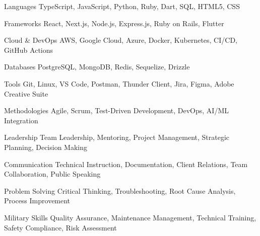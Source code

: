

\begin{cvskills}

  \cvskill
    {Languages} %
    {TypeScript, JavaScript, Python, Ruby, Dart, SQL, HTML5, CSS} %

  \cvskill
    {Frameworks} %
    {React, Next.js, Node.js, Express.js, Ruby on Rails, Flutter} %

  \cvskill
    {Cloud \& DevOps} %
    {AWS, Google Cloud, Azure, Docker, Kubernetes, CI/CD, GitHub Actions} %

  \cvskill
    {Databases} %
    {PostgreSQL, MongoDB, Redis, Sequelize, Drizzle} %

  \cvskill
    {Tools} %
    {Git, Linux, VS Code, Postman, Thunder Client, Jira, Figma, Adobe Creative Suite} %

  \cvskill
    {Methodologies} %
    {Agile, Scrum, Test-Driven Development, DevOps, AI/ML Integration} %

\end{cvskills}


\begin{cvskills}

  \cvskill
    {Leadership} %
    {Team Leadership, Mentoring, Project Management, Strategic Planning, Decision Making} %

  \cvskill
    {Communication} %
    {Technical Instruction, Documentation, Client Relations, Team Collaboration, Public Speaking} %

  \cvskill
    {Problem Solving} %
    {Critical Thinking, Troubleshooting, Root Cause Analysis, Process Improvement} %

  \cvskill
    {Military Skills} %
    {Quality Assurance, Maintenance Management, Technical Training, Safety Compliance, Risk Assessment} %

\end{cvskills}
